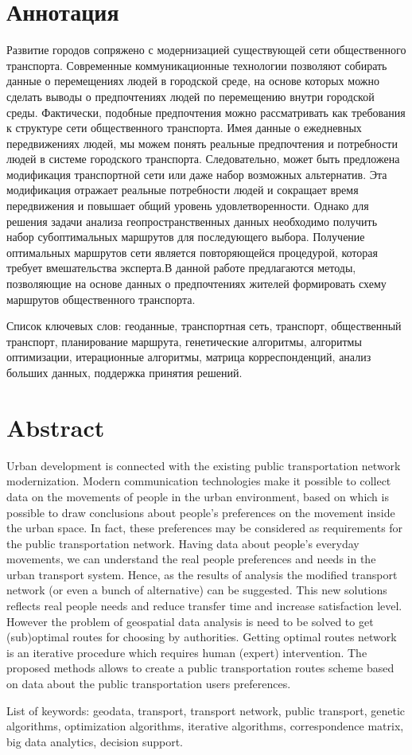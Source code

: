 \tocless\part{Аннотация}
Развитие городов сопряжено с модернизацией существующей сети общественного транспорта. Современные 
коммуникационные технологии позволяют собирать данные о перемещениях людей в городской среде, на основе 
которых можно сделать выводы о предпочтениях людей по перемещению внутри городской среды. Фактически, 
подобные предпочтения можно рассматривать как требования к структуре сети общественного транспорта. 
Имея данные о ежедневных передвижениях людей, мы можем понять реальные предпочтения и потребности людей 
в системе городского транспорта. Следовательно, может быть предложена модификация транспортной сети или 
даже набор возможных альтернатив. Эта модификация отражает реальные потребности людей и сокращает время 
передвижения и повышает общий уровень удовлетворенности. Однако для решения задачи анализа 
геопространственных данных необходимо получить набор субоптимальных маршрутов для последующего выбора. 
Получение оптимальных маршрутов сети является повторяющейся процедурой, которая требует вмешательства 
эксперта.В данной работе предлагаются методы, позволяющие на основе данных о предпочтениях жителей 
формировать схему маршрутов общественного транспорта.

Список ключевых слов: геоданные, транспортная сеть, транспорт, общественный транспорт, планирование маршрута, 
генетические алгоритмы, алгоритмы оптимизации, итерационные алгоритмы, матрица корреспонденций, анализ 
больших данных, поддержка принятия решений.

\tocless\part{Abstract}
Urban development is connected with the existing public transportation network modernization. Modern 
communication technologies make it possible to collect data on the movements of people in the urban 
environment, based on which is possible to draw conclusions about people's preferences on the movement 
inside the urban space. In fact, these preferences may be considered as requirements for the public 
transportation network. Having data about people's everyday movements, we can understand the real 
people preferences and needs in the urban transport system. Hence, as the results of analysis the 
modified transport network (or even a bunch of alternative) can be suggested. This new solutions reflects 
real people needs and reduce transfer time and increase satisfaction level. However the problem of 
geospatial data analysis is need to be solved to get (sub)optimal routes for choosing by authorities. 
Getting optimal routes network is an iterative procedure which requires human (expert) intervention.
The proposed methods allows to create a public transportation routes scheme based on data about the 
public transportation users preferences.

List of keywords: geodata, transport, transport network, public transport, genetic algorithms, 
optimization algorithms, iterative algorithms, correspondence matrix, big data analytics, decision support.
